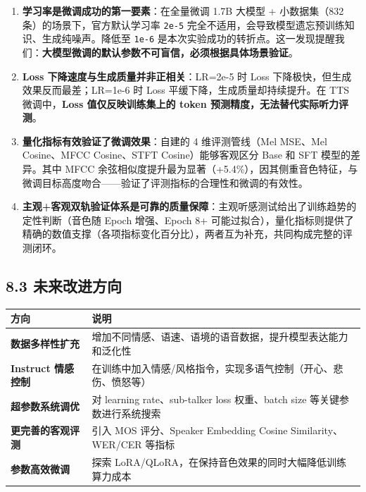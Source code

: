 \documentclass[
  english,
  letterpaper,
  DIV=11,
  numbers=noendperiod]{scrartcl}
\newcounter{none} %
\begin{document}
\begin{enumerate}
\def\labelenumi{\arabic{enumi}.}
\item
  \textbf{学习率是微调成功的第一要素}：在全量微调 1.7B 大模型 +
  小数据集（832 条）的场景下，官方默认学习率 \texttt{2e-5}
  完全不适用，会导致模型遗忘预训练知识、生成纯噪声。降低至 \texttt{1e-6}
  是本次实验成功的转折点。这一发现提醒我们：\textbf{大模型微调的默认参数不可盲信，必须根据具体场景验证}。
\item
  \textbf{Loss 下降速度与生成质量并非正相关}：LR=2e-5 时 Loss
  下降极快，但生成效果反而最差；LR=1e-6 时 Loss
  平缓下降，生成质量却持续提升。在 TTS 微调中，\textbf{Loss
  值仅反映训练集上的 token 预测精度，无法替代实际听力评测}。
\item
  \textbf{量化指标有效验证了微调效果}：自建的 4 维评测管线（Mel MSE、Mel
  Cosine、MFCC Cosine、STFT Cosine）能够客观区分 Base 和 SFT
  模型的差异。其中 MFCC
  余弦相似度提升最为显著（+5.4\%），因其侧重音色特征，与微调目标高度吻合------验证了评测指标的合理性和微调的有效性。
\item
  \textbf{主观+客观双轨验证体系是可靠的质量保障}：主观听感测试给出了训练趋势的定性判断（音色随
  Epoch 增强、Epoch 8+
  可能过拟合），量化指标则提供了精确的数值支撑（各项指标变化百分比），两者互为补充，共同构成完整的评测闭环。
\end{enumerate}

\subsection{8.3
未来改进方向}\label{ux672aux6765ux6539ux8fdbux65b9ux5411}

{\def\LTcaptype{none} %
\begin{longtable}[]{@{}
  >{\raggedright\arraybackslash}p{}
  >{\raggedright\arraybackslash}p{}@{}}
\toprule\noalign{}
\begin{minipage}[b]{\linewidth}\raggedright
方向
\end{minipage} & \begin{minipage}[b]{\linewidth}\raggedright
说明
\end{minipage} \\
\midrule\noalign{}
\endhead
\bottomrule\noalign{}
\endlastfoot
\textbf{数据多样性扩充} &
增加不同情感、语速、语境的语音数据，提升模型表达能力和泛化性 \\
\textbf{Instruct 情感控制} &
在训练中加入情感/风格指令，实现多语气控制（开心、悲伤、愤怒等） \\
\textbf{超参数系统调优} & 对 learning rate、sub-talker loss 权重、batch
size 等关键参数进行系统搜索 \\
\textbf{更完善的客观评测} & 引入 MOS 评分、Speaker Embedding Cosine
Similarity、WER/CER 等指标 \\
\textbf{参数高效微调} & 探索
LoRA/QLoRA，在保持音色效果的同时大幅降低训练算力成本 \\
\end{longtable}
}
\end{document}
